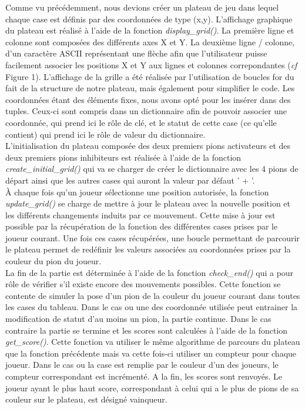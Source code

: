Comme vu précédemment, nous devions créer un plateau de jeu dans lequel chaque case est définis par des coordonnées de type (x,y).
L'affichage graphique du plateau est réalisé à l'aide de la fonction \textit{display\_grid()}. La première ligne et colonne sont composées des différents axes X et Y. La deuxième ligne / colonne, d'un caractère ASCII représentant une flèche afin que l'utilisateur puisse facilement associer les positions X et Y aux lignes et colonnes correpondantes (\textit{cf} Figure 1). L'affichage de la grille a été réalisée par l'utilisation de boucles for du fait de la structure de notre plateau, mais également pour simplifier le code.
Les coordonnées étant des éléments fixes, nous avons opté pour les insérer dans des tuples. Ceux-ci sont compris dans un dictionnaire afin de pouvoir associer une coordonnée, qui prend ici le rôle de clé, et le statut de cette case (ce qu'elle contient) qui prend ici le rôle de valeur du dictionnaire.
\\L'initialisation du plateau composée des deux premiers pions activateurs et des deux premiers pions inhibiteurs est réalisée à l'aide de la fonction \textit{create\_initial\_grid()} qui va se charger de créer le dictionnaire avec les 4 pions de départ ainsi que les autres cases qui auront la valeur par défaut ' + '.
\\À chaque fois qu'un joueur sélectionne une position autorisée, la fonction \textit{update\_grid()} se charge de mettre à jour le plateau avec la nouvelle position et les différents changements induits par ce mouvement. Cette mise à jour est possible par la récupération de la fonction des différentes cases prises par le joueur courant. Une fois ces cases récupérées, une boucle permettant de parcourir le plateau permet de redéfinir les valeurs associées au coordonnées prises par la couleur du pion du joueur.
\\La fin de la partie est déterminée à l'aide de la fonction \textit{check\_end()} qui a pour rôle de vérifier s'il existe encore des mouvements possibles. Cette fonction se contente de simuler la pose d'un pion de la couleur du joueur courant dans toutes les cases du tableau. Dans le cas ou une des coordonnée utilisée peut entrainer la modification de statut d'au moins un pion, la partie continue. Dans le cas contraire la partie se termine et les scores sont calculées à l'aide de la fonction \textit{get\_score()}. Cette fonction va utiliser le même algorithme de parcours du plateau que la fonction précédente mais va cette fois-ci utiliser un compteur pour chaque joueur. Dans le cas ou la case est remplie par le couleur d'un des joueurs, le compteur correspondant est incrémenté. A la fin, les scores sont renvoyés. Le joueur ayant le plus haut score, correspondant à celui qui a le plus de pions de sa couleur sur le plateau, est désigné vainqueur.

